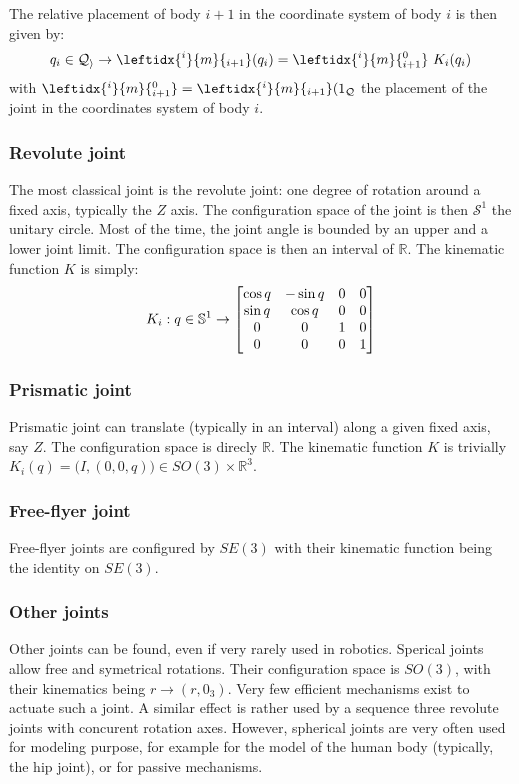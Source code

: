 \documentclass{book}
\begin{document}
The relative placement of body $i+1$ in the coordinate system of body $i$ is then given by:
\[ q_i \in \mathcal{Q_i} \rightarrow \leftidx{^i}{m}{_{i+1}}(q_i) = \leftidx{^i}{m}{_{i+1}^0} \  K_i(q_i) \]
with $\leftidx{^i}{m}{_{i+1}^0} = \leftidx{^i}{m}{_{i+1}}(1_\mathcal{Q}$ the placement of the joint in the coordinates system of body $i$.


\subsubsection{Revolute joint}

The most classical joint is the revolute joint: one degree of rotation around a fixed axis, typically the $Z$ axis. The configuration space of the joint is then $\mathcal{S}^1$ the unitary circle. Most of the time, the joint angle is bounded by an upper and a lower joint limit. The configuration space is then an interval of $\mathbb{R}$. The kinematic function $K$ is simply:
\[ K_i: q \in \mathbb{S}^1 \rightarrow \begin{bmatrix} \cos q & -\sin q & 0 & 0 \\ \sin q & \cos q & 0 & 0 \\ 0 & 0 & 1 & 0 \\ 0 & 0 & 0 & 1 \end{bmatrix} \]

\subsubsection{Prismatic joint}

Prismatic joint can translate (typically in an interval) along a given fixed axis, say $Z$. The configuration space is direcly $\mathbb{R}$. The kinematic function $K$ is trivially $K_i(q) = \big(I,(0,0,q)\big) \in SO(3)\times\mathbb{R}^3$.

\subsubsection{Free-flyer joint}

Free-flyer joints are configured by $SE(3)$ with their kinematic function being the identity on $SE(3)$. 

\subsubsection{Other joints}

Other joints can be found, even if very rarely used in robotics. Sperical joints allow free and symetrical rotations. Their configuration space is $SO(3)$, with their kinematics being $r \rightarrow (r,0_3)$. Very few efficient mechanisms exist to actuate such a joint. A similar effect is rather used by a sequence three revolute joints with concurent rotation axes. However, spherical joints are very often used for modeling purpose, for example for the model of the human body (typically, the hip joint), or for passive mechanisms.
\end{document}
